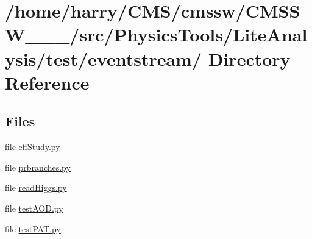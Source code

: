 \hypertarget{dir_000002}{
\section{/home/harry/CMS/cmssw/CMSSW\_\_\_/src/Physics\-Tools/Lite\-Analysis/test/eventstream/ Directory Reference}
\label{dir_000002}
}


\subsection*{Files}
\begin{CompactItemize}
\item 
file \hyperlink{effStudy_8py}{eff\-Study.py}
\item 
file \hyperlink{prbranches_8py}{prbranches.py}
\item 
file \hyperlink{readHiggs_8py}{read\-Higgs.py}
\item 
file \hyperlink{testAOD_8py}{test\-AOD.py}
\item 
file \hyperlink{testPAT_8py}{test\-PAT.py}
\end{CompactItemize}
